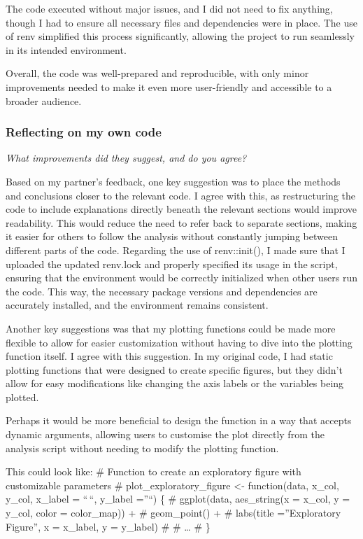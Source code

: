 \documentclass[
]{article}
\begin{document}
The code executed without major issues, and I did not need to fix
anything, though I had to ensure all necessary files and dependencies
were in place. The use of renv simplified this process significantly,
allowing the project to run seamlessly in its intended environment.

Overall, the code was well-prepared and reproducible, with only minor
improvements needed to make it even more user-friendly and accessible to
a broader audience.

\subsubsection{Reflecting on my own
code}\label{reflecting-on-my-own-code}

\emph{What improvements did they suggest, and do you agree?}

Based on my partner's feedback, one key suggestion was to place the
methods and conclusions closer to the relevant code. I agree with this,
as restructuring the code to include explanations directly beneath the
relevant sections would improve readability. This would reduce the need
to refer back to separate sections, making it easier for others to
follow the analysis without constantly jumping between different parts
of the code. Regarding the use of renv::init(), I made sure that I
uploaded the updated renv.lock and properly specified its usage in the
script, ensuring that the environment would be correctly initialized
when other users run the code. This way, the necessary package versions
and dependencies are accurately installed, and the environment remains
consistent.

Another key suggestions was that my plotting functions could be made
more flexible to allow for easier customization without having to dive
into the plotting function itself. I agree with this suggestion. In my
original code, I had static plotting functions that were designed to
create specific figures, but they didn't allow for easy modifications
like changing the axis labels or the variables being plotted.

Perhaps it would be more beneficial to design the function in a way that
accepts dynamic arguments, allowing users to customise the plot directly
from the analysis script without needing to modify the plotting
function.

This could look like: \# Function to create an exploratory figure with
customizable parameters \# plot\_exploratory\_figure \textless-
function(data, x\_col, y\_col, x\_label = ``\,``, y\_label =''``) \{ \#
ggplot(data, aes\_string(x = x\_col, y = y\_col, color = color\_map)) +
\# geom\_point() + \# labs(title =''Exploratory Figure'', x = x\_label,
y = y\_label) \# \# \ldots{} \# \}
\end{document}
